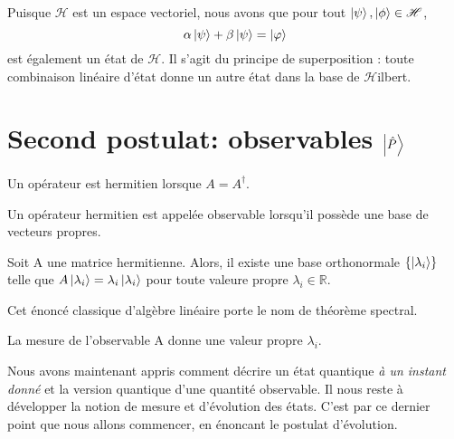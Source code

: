 \documentclass[../notesdecours.tex]{subfiles}
\begin{document}
    \begin{property}
        Puisque $\mathcal{H}$ est un espace vectoriel, nous avons que pour tout $\ket{\psi},\ket{\phi}\in\mathcal{H}$, 
        \begin{equation}
            \alpha\ket{\psi}+\beta\ket{\psi}=\ket{\varphi}
        \end{equation}
        est également un état de $\mathcal{H}$. Il s'agit du principe de superposition : toute combinaison linéaire d'état donne un autre état dans la base de $\mathcal{H}$ilbert.
        \label{Superposition}
    \end{property}

    \section{Second postulat: observables $\ket{\hat{P}}$}

    \begin{definition}
        Un opérateur est hermitien lorsque $A=A^\dagger$.
    \end{definition}

    \begin{definition}
        Un opérateur hermitien est appelée observable lorsqu'il possède une base de vecteurs propres.
    \end{definition}

    \begin{theorem}
        Soit A une matrice hermitienne. Alors, il existe une base orthonormale $\{\ket{\lambda_i}\}$ telle que $A\ket{\lambda_i}=\lambda_i\ket{\lambda_i}$ pour toute valeure propre $\lambda_i\in\mathbb{R}$.
    \end{theorem}

    \begin{remark}
        Cet énoncé classique d'algèbre linéaire porte le nom de théorème spectral.
    \end{remark}

    \begin{remark}
        La mesure de l'observable A donne une valeur propre $\lambda_i$.
    \end{remark}

    Nous avons maintenant appris comment décrire un état quantique \textit{à un instant donné} et la version quantique d'une quantité observable. Il nous reste à développer la notion de mesure et d'évolution des états. C'est par ce dernier point que nous allons commencer, en énoncant le postulat d'évolution.
\end{document}
